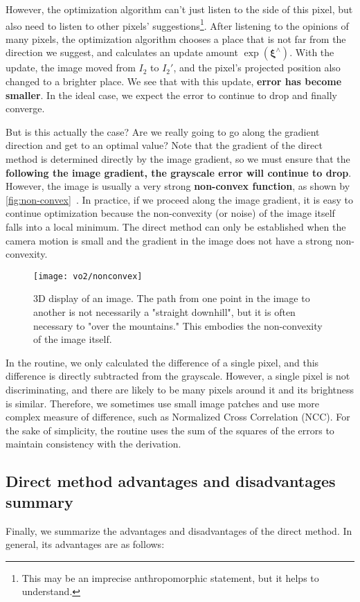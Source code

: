 However, the optimization algorithm can't just listen to the side of this pixel, but also need to listen to other pixels' suggestions\footnote{ This may be an imprecise anthropomorphic statement, but it helps to understand. }. After listening to the opinions of many pixels, the optimization algorithm chooses a place that is not far from the direction we suggest, and calculates an update amount $\exp ({\bm{\xi}^\wedge } )$. With the update, the image moved from $I_2$ to $I_2'$, and the pixel's projected position also changed to a brighter place. We see that with this update, \textbf{error has become smaller}. In the ideal case, we expect the error to continue to drop and finally converge.

But is this actually the case? Are we really going to go along the gradient direction and get to an optimal value? Note that the gradient of the direct method is determined directly by the image gradient, so we must ensure that the \textbf{following the image gradient, the grayscale error will continue to drop}. However, the image is usually a very strong \textbf{non-convex function}, as shown by \autoref{fig:non-convex}~. In practice, if we proceed along the image gradient, it is easy to continue optimization because the non-convexity (or noise) of the image itself falls into a local minimum. The direct method can only be established when the camera motion is small and the gradient in the image does not have a strong non-convexity.

\begin{figure}[!htp]
\centering
\texttt{[image: vo2/nonconvex]}
\caption{3D display of an image. The path from one point in the image to another is not necessarily a "straight downhill", but it is often necessary to "over the mountains." This embodies the non-convexity of the image itself. }
\label{fig:non-convex}
\end{figure}

In the routine, we only calculated the difference of a single pixel, and this difference is directly subtracted from the grayscale. However, a single pixel is not discriminating, and there are likely to be many pixels around it and its brightness is similar. Therefore, we sometimes use small image patches and use more complex measure of difference, such as Normalized Cross Correlation (NCC). For the sake of simplicity, the routine uses the sum of the squares of the errors to maintain consistency with the derivation.

\subsection{Direct method advantages and disadvantages summary}
Finally, we summarize the advantages and disadvantages of the direct method. In general, its advantages are as follows:

